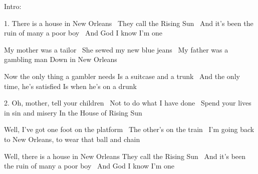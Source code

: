 \resetVars
{}
\MakeHeader
\Lyrics

Intro:
~~~~~~~~~~~~~~~~~~~~~

1. There is a house in New Orleans~
They call the Rising Sun~
And it's been the ruin of many a poor boy~
And God I know I'm one~

My mother was a tailor~
She sewed my new blue jeans~
My father was a gambling man
Down in New Orleans~

Now the only thing a gambler needs
Is a suitcase and a trunk~
And the only time, he's satisfied
Is when he's on a drunk~

2. Oh, mother, tell your children~
Not to do what I have done~
Spend your lives in sin and misery
In the House of Rising Sun~

Well, I've got one foot on the platform~
The other's on the train~
I'm going back to New Orleans,
to wear that ball and chain~

Well, there is a house in New Orleans
They call the Rising Sun~
And it's been the ruin of many a poor boy~
And God I know I'm one~

\Next
